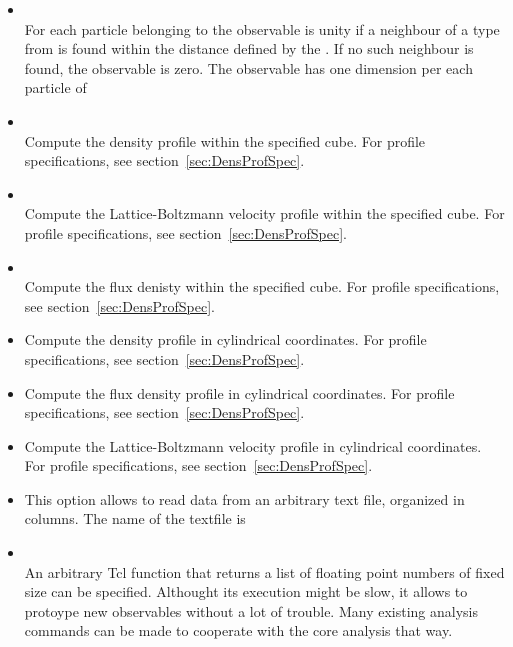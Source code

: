 \begin{itemize}
    \item {}    \\
          For each particle belonging to  
          the observable is unity if a neighbour of a type from 
           is found within the distance 
          defined by the . If no such neighbour is found, the 
          observable is zero. The observable has one dimension per each 
          particle of 
    \item {}    \\
          Compute the density profile within the specified cube.
          For profile specifications, see section~\ref{sec:DensProfSpec}.

    \item {}    \\
          Compute the Lattice-Boltzmann velocity profile within the specified cube.
          For profile specifications, see section~\ref{sec:DensProfSpec}.

    \item {}    \\
          Compute the flux denisty within the specified cube.
          For profile specifications, see section~\ref{sec:DensProfSpec}.
    \item {}
        Compute the density profile in cylindrical coordinates.
          For profile specifications, see section~\ref{sec:DensProfSpec}.
    \item {}
        Compute the flux density profile in cylindrical coordinates.
          For profile specifications, see section~\ref{sec:DensProfSpec}.
    \item {}
        Compute the Lattice-Boltzmann velocity profile in cylindrical coordinates.
          For profile specifications, see section~\ref{sec:DensProfSpec}.
    \item {}
        This option allows to read data from an arbitrary text file, organized in columns.
        The name of the textfile is 
    \item {} \\
        An arbitrary Tcl function that returns a list of floating point numbers of fixed size
         can be specified. Althought its execution might be slow, it allows 
        to protoype new observables without a lot of trouble.
        Many existing analysis commands can be made to cooperate with the core analysis that way.
  \end{itemize}

